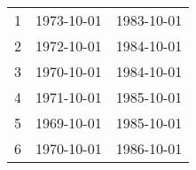 % 
\begin{tabular}{ccc}
  \hline
  \hline
1 & 1973-10-01 & 1983-10-01 \\ 
  2 & 1972-10-01 & 1984-10-01 \\ 
  3 & 1970-10-01 & 1984-10-01 \\ 
  4 & 1971-10-01 & 1985-10-01 \\ 
  5 & 1969-10-01 & 1985-10-01 \\ 
  6 & 1970-10-01 & 1986-10-01 \\ 
   \hline
\end{tabular}

